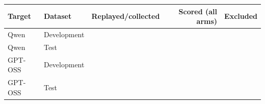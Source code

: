 \begin{tabular}{llrrr}
\toprule
Target & Dataset & Replayed/collected & Scored (all arms) & Excluded \\
\midrule
Qwen & Development & \qwenDevelopmentCollectionOrReplayedEpisodes{} & \qwenDevelopmentScoredEpisodesAllConditions{} & \qwenDevelopmentExcluded{} \\
Qwen & Test & \qwenFreshCollectionOrReplayedEpisodes{} & \qwenFreshScoredEpisodesAllConditions{} & \qwenFreshExcluded{} \\
GPT-OSS & Development & \gptossDevelopmentCollectionOrReplayedEpisodes{} & \gptossDevelopmentScoredEpisodesAllConditions{} & \gptossDevelopmentExcluded{} \\
GPT-OSS & Test & \gptossFreshCollectionOrReplayedEpisodes{} & \gptossFreshScoredEpisodesAllConditions{} & \gptossFreshExcluded{} \\
\bottomrule
\end{tabular}
